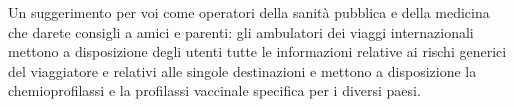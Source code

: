 Un suggerimento per voi come operatori della sanità pubblica e della
medicina che darete consigli a amici e parenti: gli ambulatori dei
viaggi internazionali mettono a disposizione degli utenti tutte le
informazioni relative ai rischi generici del viaggiatore e relativi alle
singole destinazioni e mettono a disposizione la chemioprofilassi e la
profilassi vaccinale specifica per i diversi paesi.